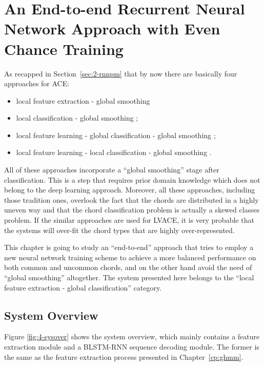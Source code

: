 
\chapter{An End-to-end Recurrent Neural Network Approach with Even Chance Training}\label{cp:endtoend} %


As recapped in Section~\ref{sec:2-rnnpm} that by now there are basically four approaches for ACE:
\begin{itemize}
\item local feature extraction - global smoothing \cite{fujishima1999realtime,sheh2003chord}
\item local classification - global smoothing \cite{humphrey2012rethinking};
\item local feature learning - global classification - global smoothing \cite{boulanger2013audio,sigtia2015audio};
\item local feature learning - local classification - global smoothing \cite{zhou2015chord}.
\end{itemize}
All of these approaches incorporate a ``global smoothing'' stage after classification. This is a step that requires prior domain knowledge which does not belong to the deep learning approach. Moreover, all these approaches, including those tradition ones, overlook the fact that the chords are distributed in a highly uneven way and that the chord classification problem is actually a skewed classes problem. If the similar approaches are used for LVACE, it is very probable that the systems will over-fit the chord types that are highly over-represented.

This chapter is going to study an ``end-to-end'' approach that tries to employ a new neural network training scheme to achieve a more balanced performance on both common and uncommon chords, and on the other hand avoid the need of ``global smoothing'' altogether. The system presented here belongs to the ``local feature extraction - global classification'' category.


\section{System Overview}\label{sec:4-sysover}
Figure \ref{fig:4-sysover} shows the system overview, which mainly contains a feature extraction module and a BLSTM-RNN sequence decoding module. The former is the same as the feature extraction process presented in Chapter~\ref{cp:ghmm}.

